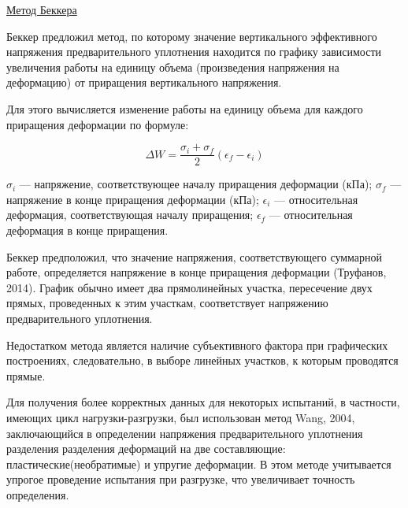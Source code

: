 \underline{Метод Беккера}

Беккер предложил метод, по которому значение вертикального эффективного 
напряжения предварительного уплотнения находится по 
графику зависимости увеличения работы на единицу объема 
(произведения напряжения на деформацию) от приращения вертикального напряжения.

Для этого вычисляется изменение работы на единицу объема для каждого
приращения деформации по формуле:

\[
   \Delta W = \frac{\sigma_i + \sigma_f}{2}(\epsilon_f - \epsilon_i)
\]

$\sigma_i$ --- напряжение, соответствующее началу приращения деформации (кПа); 
$\sigma_f$ --- напряжение в конце приращения деформации (кПа);
$\epsilon_i$ --- относительная деформация, соответствующая началу приращения; 
$\epsilon_f$ --- относительная деформация в конце
приращения.

Беккер предположил, что значение напряжения, соответствующего суммарной 
работе, определяется напряжение в конце приращения деформации (Труфанов, 2014).
График обычно имеет два прямолинейных участка, пересечение 
двух прямых, проведенных к этим участкам, соответствует 
напряжению предварительного уплотнения. 

Недостатком метода является наличие субъективного фактора при
графических построениях, следовательно, в выборе линейных участков, 
к которым проводятся прямые.

Для получения более корректных данных для некоторых испытаний, 
в частности, имеющих цикл нагрузки-разгрузки, был использован 
метод Wang, 2004, заключающийся в определении напряжения 
предварительного уплотнения разделения разделения деформаций на две 
составляющие: пластические(необратимые) и упругие деформации.
В этом методе учитывается упрогое проведение испытания при разгрузке, 
что увеличивает точность определения.
